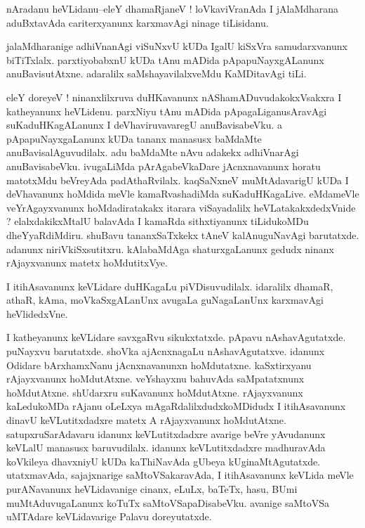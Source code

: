 \documentclass{article}
\begin{document}
\begin{mn}%
nAradanu heVLidanu--eleY dhamaRjaneV ! loVkaviVranAda I jAlaMdharana aduBxtavAda 
cariterxyanunx karxmavAgi ninage tiLisidanu.
\end{mn}

\begin{mn}%
jalaMdharanige adhiVnanAgi viSuNxvU kUDa IgalU kiSxVra samudarxvanunx biTiTxlalx. 
parxtiyobabxnU kUDa tAnu mADida pApapuNayxgALanunx anuBavisutAtxne. adaralilx 
saMshayavilalxveMdu KaMDitavAgi tiLi.
\end{mn}

\begin{mn}%
eleY doreyeV ! ninanxlilxruva duHKavanunx nAShamADuvudakokxVsakxra I katheyanunx heVLidenu. 
parxNiyu tAnu mADida pApagaLiganusAravAgi suKaduHKagALanunx I deVhaviruvavaregU 
anuBavisabeVku. a pApapuNayxgaLanunx kUDa tananx manasusx baMdaMte anuBavisalAguvudilalx. 
adu baMdaMte nAvu adakekx adhiVnarAgi anuBavisabeVku. ivugaLiMda pArAgabeVkaDare 
jAcnxnavanunx horatu matotxMdu beVreyAda padAthaRvilalx. kaqSaNxneV muMtAdavarigU kUDa I 
deVhavanunx hoMdida meVle kamaRvashadiMda suKaduHKagaLive. eMdameVle veYrAgayxvanunx 
hoMdadiratakakx itarara viSayadalilx heVLatakakxdedxVnide ? elalxdakikxMtalU balavAda I 
kamaRda sithxtiyanunx tiLidukoMDu dheYyaRdiMdiru. shuBavu tananxSaTxkekx tAneV 
kalAnuguNavAgi barutatxde. adanunx niriVkiSxsutitxru. kAlabaMdAga shaturxgaLanunx gedudx 
ninanx rAjayxvanunx matetx hoMdutitxVye.
\end{mn}

\begin{mn}%
I itihAsavanunx keVLidare duHKagaLu piVDisuvudilalx. idaralilx dhamaR, athaR, kAma, 
moVkaSxgALanUnx avugaLa guNagaLanUnx karxmavAgi heVlidedxVne.
\end{mn}

\begin{mn}%
I katheyanunx keVLidare savxgaRvu sikukxtatxde. pApavu nAshavAgutatxde. puNayxvu barutatxde. 
shoVka ajAcnxnagaLu nAshavAgutatxve. idanunx Odidare bArxhamxNanu jAcnxnavanunxn 
hoMdutatxne. kaSxtirxyanu rAjayxvanunx hoMdutAtxne. veYshayxnu bahuvAda saMpatatxnunx 
hoMdutAtxne. shUdarxru suKavanunx hoMdutAtxne. rAjayxvanunx kaLedukoMDa rAjanu oLeLxya 
mAgaRdalilxdudxkoMDidudx I itihAsavanunx dinavU keVLutitxdadxre matetx A rAjayxvanunx 
hoMdutAtxne. satupxruSarAdavaru idanunx keVLutitxdadxre avarige beVre yAvudanunx keVLalU 
manasusx baruvudilalx. idanunx keVLutitxdadxre madhuravAda koVkileya dhavxniyU kUDa 
kaThiNavAda gUbeya kUginaMtAgutatxde. utatxmavAda, sajajxnarige saMtoVSakaravAda, I 
itihAsavanunx keVLida meVle purANavanunx heVLidavanige cinanx, eLuLx, baTeTx, hasu, BUmi 
muMtAduvugaLanunx koTuTx saMtoVSapaDisabeVku. avanige saMtoVSa uMTAdare keVLidavarige Palavu 
doreyutatxde.
\end{mn}
\end{document}
